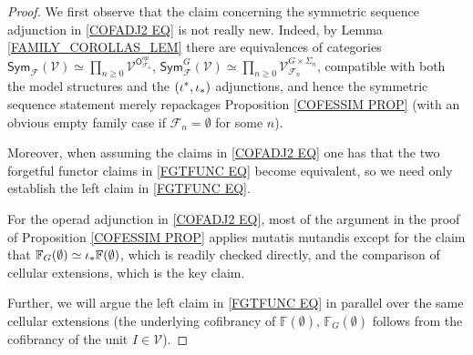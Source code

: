 \documentclass[a4paper,10pt
,draft
]{article}%
\numberwithin{equation}{section}
\numberwithin{figure}{section}
\theoremstyle{definition} %
\newcommand{\1}{\ensuremath{\mathbbm 1}}%
\begin{document}
\begin{proof}
We first observe that the claim concerning the symmetric sequence adjunction in \eqref{COFADJ2 EQ}
is not really new. Indeed, 
by Lemma \ref{FAMILY_COROLLAS_LEM}
there are equivalences of categories
$
\mathsf{Sym}_{\mathcal{F}}(\mathcal{V})
\simeq \prod_{n \geq 0}
\mathcal{V}^{\mathsf{O}^{op}_{\mathcal{F}_n}}
$,
$
\mathsf{Sym}^G_{\mathcal{F}}(\mathcal{V})
\simeq \prod_{n \geq 0}
\mathcal{V}_{\mathcal{F}_n}^{G \times \Sigma_n}
$,
compatible with both the model structures and the $(\iota^{\**},\iota_{\**})$ adjunctions,
and hence the symmetric sequence statement merely repackages 
Proposition \ref{COFESSIM PROP}
(with an obvious empty family case if 
$\mathcal{F}_n =\emptyset$ for some $n$).


Moreover, when assuming the claims in \eqref{COFADJ2 EQ}
one has that
the two forgetful functor claims in \eqref{FGTFUNC EQ}
become equivalent,
so we need only establish the
left claim in \eqref{FGTFUNC EQ}.


For the operad adjunction in \eqref{COFADJ2 EQ},
most of the argument in the proof of
Proposition \ref{COFESSIM PROP}
applies mutatis mutandis
except for the claim that 
$\mathbb{F}_{G} (\emptyset) \simeq \iota_{\**} \mathbb{F} (\emptyset)$, 
which is readily checked directly, 
and the comparison of cellular extensions,
which is the key claim.


Further, we will argue the left claim in \eqref{FGTFUNC EQ} in parallel over the same cellular extensions
(the underlying cofibrancy of
$\mathbb{F}(\emptyset)$, 
$\mathbb{F}_G(\emptyset)$
follows from the cofibrancy of the unit 
$I \in \mathcal{V}$).
 

\end{proof}
\end{document}
